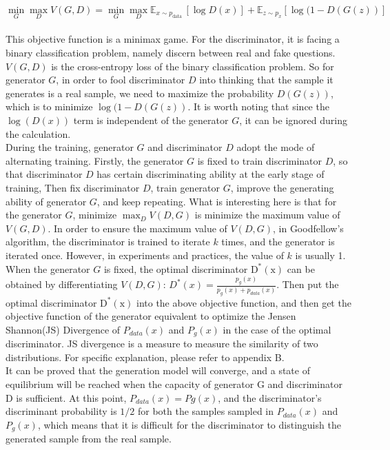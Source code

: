 \documentclass[11pt,a4paper]{article}
\begin{document}
\\
\newline
$$\min _{G} \max _{D} V(G, D)=\min _{G} \max _{D} \mathbb{E}_{x \sim p_{\text {data }}}[\log D(x)]+\mathbb{E}_{z \sim p_{x}}[\log (1-D(G(z))]$$
\\
\newline
This objective function is a minimax game. For the discriminator, it is facing a binary classification problem, namely discern between real and fake questions. $V (G, D)$ is the cross-entropy loss of the binary classification problem\citep{mao2017least}. So for generator $G$, in order to fool discriminator $D$ into thinking that the sample it generates is a real sample, we need to maximize the probability $D(G(z))$, which is to minimize $\log (1-D(G(z))$. It is worth noting that since the $\log(D(x))$ term is independent of the generator $G$, it can be ignored during the calculation. 
\\
\newline
During the training, generator $G$ and discriminator $D$ adopt the mode of alternating training. Firstly, the generator $G$ is fixed to train discriminator $D$, so that discriminator $D$ has certain discriminating ability at the early stage of training, Then fix discriminator $D$, train generator $G$, improve the generating ability of generator $G$, and keep repeating. What is interesting here is that for the generator $G$, minimize $\max _{D} V(D, G)$ is minimize the maximum value of $V (G, D)$. In order to ensure the maximum value of $V (D, G)$, in Goodfellow's algorithm, the discriminator is trained to iterate $k$ times, and the generator is iterated once. However, in experiments and practices, the value of $k$ is usually 1. When the generator $G$ is fixed, the optimal discriminator $\mathrm{D}^{*}(\mathrm{x})$ can be obtained by differentiating $V (D, G)$: $D^{*}(x)=\frac{p_{g}(x)}{p_{g}(x)+p_{d a t a}(x)}$. Then put the optimal discriminator $\mathrm{D}^{*}(\mathrm{x})$ into the above objective function, and then get the objective function of the generator equivalent to optimize the Jensen Shannon(JS) Divergence of $P_{data}(x)$ and $P_{g}(x)$ in the case of the optimal discriminator. JS divergence is a measure to measure the similarity of two distributions. For specific explanation, please refer to appendix B.
\\
\newline
It can be proved that the generation model will converge, and a state of equilibrium will be reached when the capacity of generator G and discriminator D is sufficient. At this point, $P_{data}(x)=Pg(x)$, and the discriminator's discriminant probability is $1/2$ for both the samples sampled in $P_{data}(x)$ and $P_{g}(x)$, which means that it is difficult for the discriminator to distinguish the generated sample from the real sample\citep{goodfellow2014generative}.
\\
\newline
\end{document}
